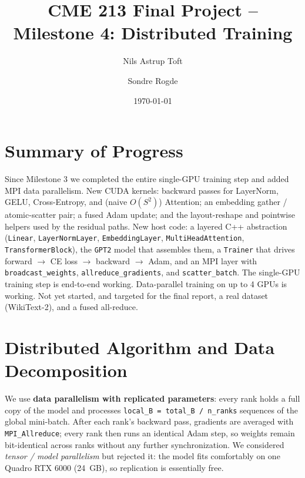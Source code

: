 \documentclass[11pt,letterpaper]{article}
\title{\vspace{-2em}CME 213 Final Project -- Milestone 4: Distributed Training}
\author{Nils Astrup Toft \and Sondre Rogde}
\date{\today}
\begin{document}
\maketitle\vspace{-1em}

\section{Summary of Progress}

Since Milestone 3 we completed the entire single-GPU training step and added MPI data parallelism. New CUDA kernels: backward passes for LayerNorm, GELU, Cross-Entropy, and (naive $O(S^2)$) Attention; an embedding gather / atomic-scatter pair; a fused Adam update; and the layout-reshape and pointwise helpers used by the residual paths. New host code: a layered C++ abstraction (\texttt{Linear}, \texttt{LayerNormLayer}, \texttt{EmbeddingLayer}, \texttt{MultiHeadAttention}, \texttt{TransformerBlock}), the \texttt{GPT2} model that assembles them, a \texttt{Trainer} that drives forward $\to$ CE loss $\to$ backward $\to$ Adam, and an MPI layer with \texttt{broadcast\_weights}, \texttt{allreduce\_gradients}, and \texttt{scatter\_batch}. The single-GPU training step is end-to-end working. Data-parallel training on up to 4 GPUs is working. Not yet started, and targeted for the final report, a real dataset (WikiText-2), and a fused all-reduce.

\section{Distributed Algorithm and Data Decomposition}

We use \textbf{data parallelism with replicated parameters}: every rank holds a full copy of the model and processes \texttt{local\_B = total\_B / n\_ranks} sequences of the global mini-batch. After each rank's backward pass, gradients are averaged with \texttt{MPI\_Allreduce}; every rank then runs an identical Adam step, so weights remain bit-identical across ranks without any further synchronization. We considered \emph{tensor / model parallelism} but rejected it: the model fits comfortably on one Quadro RTX 6000 (24~GB), so replication is essentially free.
\end{document}
